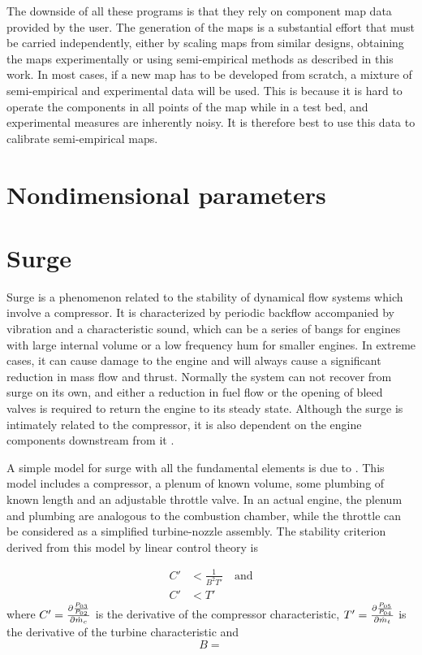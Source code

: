 \documentclass[tcc]{subfiles}
\begin{document}
The downside of all these programs is that they rely on component map data provided by the user.
The generation of the maps is a substantial effort that must be carried independently, 
either by scaling maps from similar designs, obtaining the maps experimentally 
or using semi-empirical methods as described in this work. 
In most cases, if a new map has to be developed from scratch, a mixture of semi-empirical and
experimental data will be used.
This is because it is hard to operate the components in all points of the map while in a test bed, 
and experimental measures are inherently noisy. 
It is therefore best to use this data to calibrate semi-empirical maps.

\section{Nondimensional parameters}

\section{Surge}
\label{sec:review:surge}

Surge is a phenomenon related to the stability of dynamical flow systems which involve a compressor. 
It is characterized by periodic backflow accompanied by vibration and a characteristic sound, 
which can be a series of bangs for engines with large internal volume or a low frequency hum for smaller engines.
In extreme cases, it can cause damage to the engine and will always cause a significant reduction in mass flow and thrust. 
Normally the system can not recover from surge on its own, and either a reduction in fuel flow or the opening of bleed valves is required to return the engine to its steady state.
Although the surge is intimately related to the compressor, 
it is also dependent on the engine components downstream from it \cite{Sparks1983}.

A simple model for surge with all the fundamental elements is due to \textcite{Finsk}. This model includes a compressor, a plenum of known volume, some plumbing of known length and an adjustable throttle valve. 
In an actual engine, the plenum and plumbing are analogous to the combustion chamber, while the throttle can be considered as a simplified turbine-nozzle assembly. 
The stability criterion derived from this model by linear control theory is

\begin{align}
    C' &< \frac{1}{B^2 T'} \label{eqn:surge} \quad\text{and}\\
    C' &< T'
\end{align}
where $C' = \frac{\partial \frac{P_{03}}{P_{02}}}{\partial \dot{m}_c}$ is the derivative of the compressor characteristic, $T' = \frac{\partial \frac{P_{05}}{P_{04}}}{\partial \dot{m}_t}$ is the derivative of the turbine characteristic and 
\begin{equation}
    B=
\end{equation}
\end{document}
